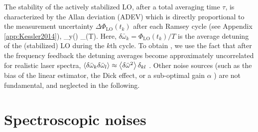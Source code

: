 The stability of the actively stabilized LO, after a total averaging time
$\tau$, is characterized by the Allan deviation (ADEV) which is directly
proportional to the measurement uncertainty $\Delta\Phi_\mathrm{LO}(t_k)$ after
each Ramsey cycle (see Appendix \ref{app:Kessler2014}),
\bel
	\label{eq:Allan-variance}
	\sigma_y(\tau) \equiv {}
	\approx
	  \Delta\Phi_(T).
\eel
Here, $\delta\bar\omega_k = \Phi_\mathrm{LO}(t_k)/T$ is the average detuning of the
(stabilized) LO during the $k$th cycle. {%
 To obtain , we use the fact that after the frequency
 feedback the detuning averages become approximately uncorrelated for realistic
 laser spectra, $\left< \delta\bar\omega_k \delta\bar\omega_l \right> \approx
 \left< \delta\bar\omega^2 \right>\delta_{kl}$ \cite{Borregaard2013,
 Andre2005,Bloom2013}}.
Other noise sources (such as the bias of the linear estimator, the Dick effect,
or a sub-optimal gain $\alpha$ \cite{Santarelli1998}) are not fundamental, and
neglected in the following.


\section{Spectroscopic noises}

